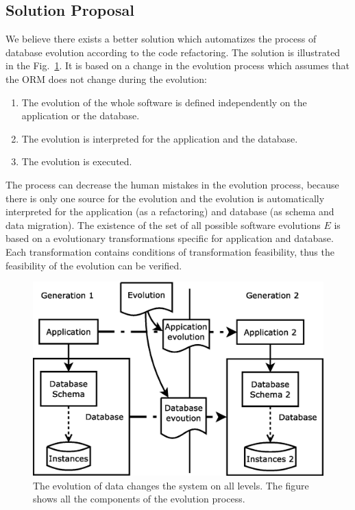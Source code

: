 \documentclass[runningheads]{comsis}
\begin{document}
\subsection{Solution Proposal}
We believe there exists a better solution which automatizes the process of database evolution according to the code refactoring. The solution is illustrated in the Fig.~\ref{fig:evolution}. It is based on a change in the evolution process which assumes that the ORM does not change during the evolution:
\begin{enumerate}
	\item The evolution of the whole software is defined independently on the application or the database.
	\item The evolution is interpreted for the application and the database.
	\item The evolution is executed.
\end{enumerate}
The process can decrease the human mistakes in the evolution process, because there is only one source for the evolution and the evolution is automatically interpreted for the application (as a refactoring) and database (as schema and data migration). The existence of the set of all possible software evolutions $E$ is based on a evolutionary transformations specific for application and database. Each transformation contains conditions of transformation feasibility, thus the feasibility of the evolution can be verified. 

\begin{figure}
\centering
	\includegraphics[width=.7\textwidth]{./images/evolution_simple}
	\caption{The evolution of data changes the system on all levels. The figure shows all the components of the evolution process.}
	\label{fig:evolution}
\end{figure}
\end{document}
